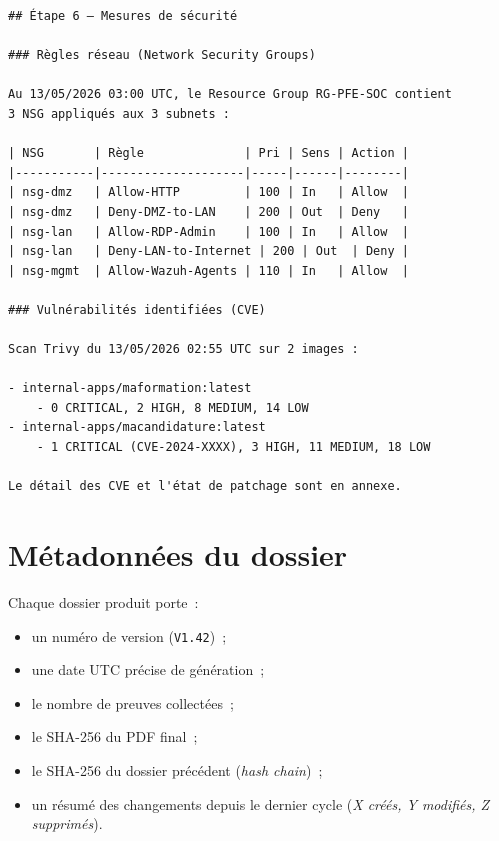 \begin{lstlisting}[language={[LaTeX]TeX},caption={Extrait du
Markdown généré par le template \texttt{dossier.md.j2}.}]
## Étape 6 — Mesures de sécurité

### Règles réseau (Network Security Groups)

Au 13/05/2026 03:00 UTC, le Resource Group RG-PFE-SOC contient
3 NSG appliqués aux 3 subnets :

| NSG       | Règle              | Pri | Sens | Action |
|-----------|--------------------|-----|------|--------|
| nsg-dmz   | Allow-HTTP         | 100 | In   | Allow  |
| nsg-dmz   | Deny-DMZ-to-LAN    | 200 | Out  | Deny   |
| nsg-lan   | Allow-RDP-Admin    | 100 | In   | Allow  |
| nsg-lan   | Deny-LAN-to-Internet | 200 | Out  | Deny |
| nsg-mgmt  | Allow-Wazuh-Agents | 110 | In   | Allow  |

### Vulnérabilités identifiées (CVE)

Scan Trivy du 13/05/2026 02:55 UTC sur 2 images :

- internal-apps/maformation:latest
    - 0 CRITICAL, 2 HIGH, 8 MEDIUM, 14 LOW
- internal-apps/macandidature:latest
    - 1 CRITICAL (CVE-2024-XXXX), 3 HIGH, 11 MEDIUM, 18 LOW

Le détail des CVE et l'état de patchage sont en annexe.
\end{lstlisting}

\section{Métadonnées du dossier}

Chaque dossier produit porte~:

\begin{itemize}
  \item un numéro de version (\texttt{V1.42})~;
  \item une date UTC précise de génération~;
  \item le nombre de preuves collectées~;
  \item le SHA-256 du PDF final~;
  \item le SHA-256 du dossier précédent (\emph{hash chain})~;
  \item un résumé des changements depuis le dernier cycle
    (\emph{X créés, Y modifiés, Z supprimés}).
\end{itemize}
